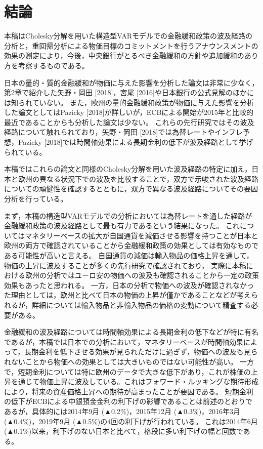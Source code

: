\documentclass[12pt]{jarticle}
\begin{document}
{\newpage
\section{結論}

本稿はCholesky分解を用いた構造型VARモデルでの金融緩和政策の波及経路の分析と，重回帰分析による物価目標のコミットメントを行うアナウンスメントの効果の測定により，今後，中央銀行がとるべき金融緩和の方針や追加緩和のあり方を考察するものである。

日本の量的・質的金融緩和が物価に与えた影響を分析した論文は非常に少なく，第2章で紹介した矢野・岡田 [2018]，宮尾 [2016]や日本銀行の公式見解のほかには知られていない。
また，欧州の量的金融緩和政策が物価に与えた影響を分析した論文としてはPazicky [2018]が詳しいが，ECBによる開始が2015年と比較的最近であることからも分析した論文は少ない。
これらの先行研究ではその波及経路について触れられており，矢野・岡田 [2018]では為替レートやインフレ予想，Pazicky [2018]では時間軸効果による長期金利の低下が波及経路として挙げられている。

本稿ではこれらの論文と同様のCholesky分解を用いた波及経路の特定に加え，日本と欧州の異なる状況下での波及を比較することで，双方で示唆された波及経路についての頑健性を確認するとともに，双方で異なる波及経路についてその要因分析を行っている。

まず，本稿の構造型VARモデルでの分析においては為替レートを通した経路が金融緩和政策の波及経路として最も有力であるという結果になった。
これについてはマネタリーベースの拡大が自国通貨を減価させる影響を持つことが日本と欧州の両方で確認されていることから金融緩和政策の効果としては有効なものである可能性が高いと言える。
自国通貨の減価は輸入物品の価格上昇を通して，物価の上昇に波及することが多くの先行研究で確認されており，
実際に本稿における欧州の分析ではユーロ安の物価への波及も確認されることから一定の政策効果もあったと思われる。
一方，日本の分析で物価への波及が確認されなかった理由としては，欧州と比べて日本の物価の上昇が僅かであることなどが考えられるが，詳細については輸入物品と非輸入物品の価格の変動について精査する必要がある。

金融緩和の波及経路については時間軸効果による長期金利の低下などが特に有名であるが，本稿では日本での分析において，マネタリーベースが時間軸効果によって，長期金利を低下させる効果が見られただけに過ぎず，物価への波及も見られないことから物価への効果としては大きいものではない可能性が高い。
一方で，短期金利については特に欧州のデータで大きな低下があり，これが株価の上昇を通じて物価上昇に波及している。これはフォワード・ルッキングな期待形成により，将来の資産価格上昇への期待が高まったことが要因である。
短期金利の低下がECBによる中銀預金金利の利下げの影響であることは前述のとおりであるが，具体的には2014年9月 (▲0.2\%)，2015年12月 (▲0.3\%)，2016年3月 (▲0.4\%)，2019年9月 (▲0.5\%)の4回の利下げが行われている。
これは2014年6月 (▲0.1\%)以来，利下げのない日本と比べて，格段に多い利下げの幅と回数である。

}
\end{document}
